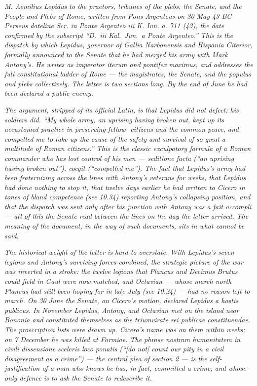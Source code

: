 
\textit{M. Aemilius Lepidus to the praetors, tribunes of
the plebs, the Senate, and the People and Plebs of Rome,
written from Pons Argenteus on 30 May 43 BC --- Perseus
dateline \textit{Scr. in Ponte Argenteo iii K. Iun. a.
711 (43)}, the date confirmed by the subscript ``D.~iii
Kal.~Jun.~a Ponte Argenteo.'' This is the dispatch by
which Lepidus, governor of Gallia Narbonensis and
Hispania Citerior, formally announced to the Senate
that he had merged his army with Mark Antony's. He
writes as \textit{imperator iterum} and \textit{pontifex
maximus}, and addresses the full constitutional ladder
of Rome --- the magistrates, the Senate, and the
populus and plebs collectively. The letter is two
sections long. By the end of June he had been declared
a public enemy.}

\textit{The argument, stripped of its official Latin,
is that Lepidus did not defect: his soldiers did.
``My whole army, an uprising having broken out, kept
up its accustomed practice in preserving fellow-
citizens and the common peace, and compelled me to
take up the cause of the safety and survival of so
great a multitude of Roman citizens.'' This is the
classic exculpatory formula of a Roman commander who
has lost control of his men --- \textit{seditione
facta} (``an uprising having broken out''),
\textit{coegit} (``compelled me''). The fact that
Lepidus's army had been fraternizing across the lines
with Antony's veterans for weeks, that Lepidus had
done nothing to stop it, that twelve days earlier he
had written to Cicero in tones of bland competence
(see 10.34) reporting Antony's collapsing position,
and that the dispatch was sent only after his junction
with Antony was a fait accompli --- all of this the
Senate read between the lines on the day the letter
arrived. The meaning of the document, in the way of
such documents, sits in what cannot be said.}

\textit{The historical weight of the letter is hard
to overstate. With Lepidus's seven legions and
Antony's surviving forces combined, the strategic
picture of the war was inverted in a stroke: the
twelve legions that Plancus and Decimus Brutus could
field in Gaul were now matched, and Octavian --- whose
march north Plancus had still been hoping for in late
July (see 10.24) --- had no reason left to march. On
30 June the Senate, on Cicero's motion, declared
Lepidus a \textit{hostis publicus}. In November
Lepidus, Antony, and Octavian met on the island near
Bononia and constituted themselves as the
triumvirate \textit{rei publicae constituendae}. The
proscription lists were drawn up. Cicero's name was
on them within weeks; on 7 December he was killed at
Formiae. The phrase \textit{nostram humanitatem in
civili dissensione sceleris loco ponatis} (``[do not]
count our pity in a civil disagreement as a crime'')
--- the central plea of section 2 --- is the
self-justification of a man who knows he has, in
fact, committed a crime, and whose only defence is to
ask the Senate to redescribe it.}
